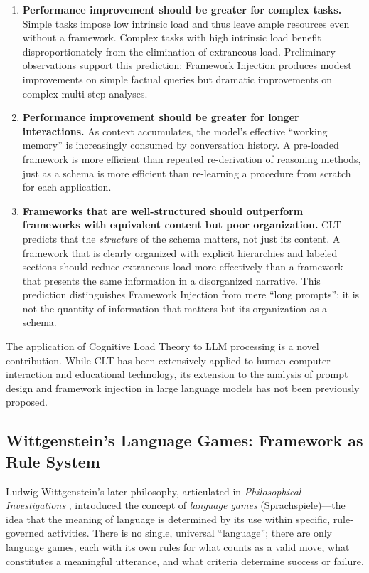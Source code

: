 \documentclass[12pt,a4paper]{article}
\begin{document}
\begin{enumerate}
    \item \textbf{Performance improvement should be greater for complex tasks.} Simple tasks impose low intrinsic load and thus leave ample resources even without a framework. Complex tasks with high intrinsic load benefit disproportionately from the elimination of extraneous load. Preliminary observations support this prediction: Framework Injection produces modest improvements on simple factual queries but dramatic improvements on complex multi-step analyses.

    \item \textbf{Performance improvement should be greater for longer interactions.} As context accumulates, the model's effective ``working memory'' is increasingly consumed by conversation history. A pre-loaded framework is more efficient than repeated re-derivation of reasoning methods, just as a schema is more efficient than re-learning a procedure from scratch for each application.

    \item \textbf{Frameworks that are well-structured should outperform frameworks with equivalent content but poor organization.} CLT predicts that the \emph{structure} of the schema matters, not just its content. A framework that is clearly organized with explicit hierarchies and labeled sections should reduce extraneous load more effectively than a framework that presents the same information in a disorganized narrative. This prediction distinguishes Framework Injection from mere ``long prompts'': it is not the quantity of information that matters but its organization as a schema.
\end{enumerate}

The application of Cognitive Load Theory to LLM processing is a novel contribution. While CLT has been extensively applied to human-computer interaction and educational technology, its extension to the analysis of prompt design and framework injection in large language models has not been previously proposed.

\subsection{Wittgenstein's Language Games: Framework as Rule System}
\label{sec:theory:wittgenstein}

Ludwig Wittgenstein's later philosophy, articulated in \emph{Philosophical Investigations} \citep{wittgenstein1953philosophical}, introduced the concept of \emph{language games} (Sprachspiele)---the idea that the meaning of language is determined by its use within specific, rule-governed activities. There is no single, universal ``language''; there are only language games, each with its own rules for what counts as a valid move, what constitutes a meaningful utterance, and what criteria determine success or failure.
\end{document}

